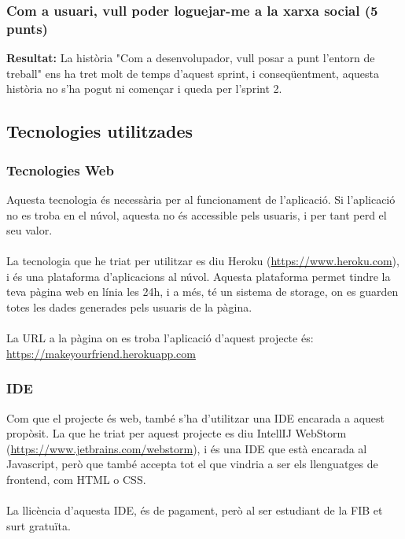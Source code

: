 \documentclass[11pt,catalan,listoffigures,listoftables]{tfgetsinf}
\begin{document}
\subsubsection{Com a usuari, vull poder loguejar-me a la xarxa social (5 punts)}

\textcolor{costumyellow}{\textbf{Resultat:}} La història "Com a desenvolupador, vull posar a punt l'entorn de treball" ens ha tret molt de temps d'aquest sprint, i conseqüentment, aquesta història no s'ha pogut ni començar i queda per l'sprint 2.

\subsection{Tecnologies utilitzades}

\subsubsection{Tecnologies Web}

Aquesta tecnologia és necessària per al funcionament de l'aplicació. Si l'aplicació no es troba en el núvol, aquesta no és accessible pels usuaris, i per tant perd el seu valor. \\ \\
La tecnologia que he triat per utilitzar es diu Heroku (\url{https://www.heroku.com}), i és una plataforma d'aplicacions al núvol. Aquesta plataforma permet tindre la teva pàgina web en línia les 24h, i a més, té un sistema de storage, on es guarden totes les dades generades pels usuaris de la pàgina.\\ \\
La URL a la pàgina on es troba l'aplicació d'aquest projecte és: \\
\url{https://makeyourfriend.herokuapp.com}

\subsubsection{IDE}

Com que el projecte és web, també s'ha d'utilitzar una IDE encarada a aquest propòsit. La que he triat per aquest projecte es diu IntellIJ WebStorm (\url{https://www.jetbrains.com/webstorm}), i és una IDE que està encarada al Javascript, però que també accepta tot el que vindria a ser els llenguatges de frontend, com HTML o CSS.\\ \\
La llicència d'aquesta IDE, és de pagament, però al ser estudiant de la FIB et surt gratuïta.
\end{document}
